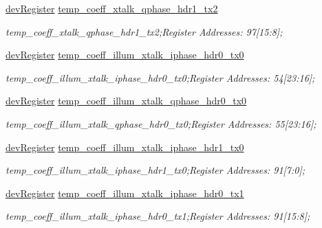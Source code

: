 \begin{DoxyCompactItemize}
\mbox{\hyperlink{classdev_register}{dev\+Register}} \mbox{\hyperlink{class_o_p_t3101_registers_a4ca18d6cc9bae3f51d18f381ae89da0b}{temp\+\_\+coeff\+\_\+xtalk\+\_\+qphase\+\_\+hdr1\+\_\+tx2}}
\begin{DoxyCompactList}\small\item\em temp\+\_\+coeff\+\_\+xtalk\+\_\+qphase\+\_\+hdr1\+\_\+tx2;Register Addresses\+: 97\mbox{[}15\+:8\mbox{]}; \end{DoxyCompactList}\item 
\mbox{\hyperlink{classdev_register}{dev\+Register}} \mbox{\hyperlink{class_o_p_t3101_registers_ad53144086be03022fe32322841fa64ef}{temp\+\_\+coeff\+\_\+illum\+\_\+xtalk\+\_\+iphase\+\_\+hdr0\+\_\+tx0}}
\begin{DoxyCompactList}\small\item\em temp\+\_\+coeff\+\_\+illum\+\_\+xtalk\+\_\+iphase\+\_\+hdr0\+\_\+tx0;Register Addresses\+: 54\mbox{[}23\+:16\mbox{]}; \end{DoxyCompactList}\item 
\mbox{\hyperlink{classdev_register}{dev\+Register}} \mbox{\hyperlink{class_o_p_t3101_registers_a68b368fcaa61021171e61acbe0655e05}{temp\+\_\+coeff\+\_\+illum\+\_\+xtalk\+\_\+qphase\+\_\+hdr0\+\_\+tx0}}
\begin{DoxyCompactList}\small\item\em temp\+\_\+coeff\+\_\+illum\+\_\+xtalk\+\_\+qphase\+\_\+hdr0\+\_\+tx0;Register Addresses\+: 55\mbox{[}23\+:16\mbox{]}; \end{DoxyCompactList}\item 
\mbox{\hyperlink{classdev_register}{dev\+Register}} \mbox{\hyperlink{class_o_p_t3101_registers_a7fc2318c1e86147cab4536f7ae8554d1}{temp\+\_\+coeff\+\_\+illum\+\_\+xtalk\+\_\+iphase\+\_\+hdr1\+\_\+tx0}}
\begin{DoxyCompactList}\small\item\em temp\+\_\+coeff\+\_\+illum\+\_\+xtalk\+\_\+iphase\+\_\+hdr1\+\_\+tx0;Register Addresses\+: 91\mbox{[}7\+:0\mbox{]}; \end{DoxyCompactList}\item 
\mbox{\hyperlink{classdev_register}{dev\+Register}} \mbox{\hyperlink{class_o_p_t3101_registers_a021ed9983624bdac9dca708e535b75b5}{temp\+\_\+coeff\+\_\+illum\+\_\+xtalk\+\_\+iphase\+\_\+hdr0\+\_\+tx1}}
\begin{DoxyCompactList}\small\item\em temp\+\_\+coeff\+\_\+illum\+\_\+xtalk\+\_\+iphase\+\_\+hdr0\+\_\+tx1;Register Addresses\+: 91\mbox{[}15\+:8\mbox{]}; \end{DoxyCompactList}\item 

\end{DoxyCompactItemize}
